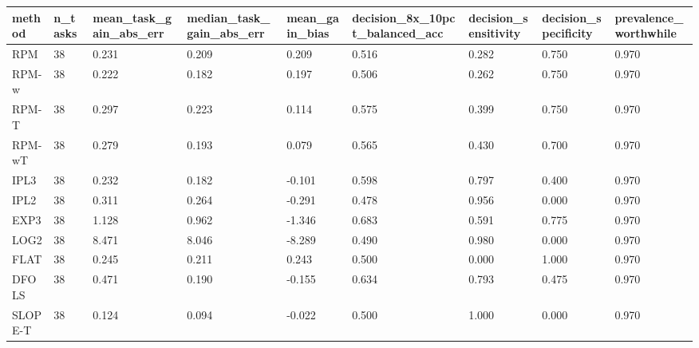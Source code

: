 \begin{tabular}{lllllllll}
\hline
method & n\_tasks & mean\_task\_gain\_abs\_err & median\_task\_gain\_abs\_err & mean\_gain\_bias & decision\_8x\_10pct\_balanced\_acc & decision\_sensitivity & decision\_specificity & prevalence\_worthwhile \\
\hline
RPM & 38 & 0.231 & 0.209 & 0.209 & 0.516 & 0.282 & 0.750 & 0.970 \\
RPM-w & 38 & 0.222 & 0.182 & 0.197 & 0.506 & 0.262 & 0.750 & 0.970 \\
RPM-T & 38 & 0.297 & 0.223 & 0.114 & 0.575 & 0.399 & 0.750 & 0.970 \\
RPM-wT & 38 & 0.279 & 0.193 & 0.079 & 0.565 & 0.430 & 0.700 & 0.970 \\
IPL3 & 38 & 0.232 & 0.182 & -0.101 & 0.598 & 0.797 & 0.400 & 0.970 \\
IPL2 & 38 & 0.311 & 0.264 & -0.291 & 0.478 & 0.956 & 0.000 & 0.970 \\
EXP3 & 38 & 1.128 & 0.962 & -1.346 & 0.683 & 0.591 & 0.775 & 0.970 \\
LOG2 & 38 & 8.471 & 8.046 & -8.289 & 0.490 & 0.980 & 0.000 & 0.970 \\
FLAT & 38 & 0.245 & 0.211 & 0.243 & 0.500 & 0.000 & 1.000 & 0.970 \\
DFOLS & 38 & 0.471 & 0.190 & -0.155 & 0.634 & 0.793 & 0.475 & 0.970 \\
SLOPE-T & 38 & 0.124 & 0.094 & -0.022 & 0.500 & 1.000 & 0.000 & 0.970 \\
\hline
\end{tabular}
